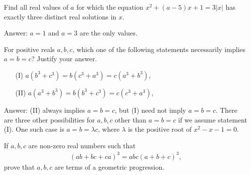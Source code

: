 \begin{tcolorbox}
\begin{question}
Find all real values of $a$ for which the equation $x^2+(a-5)x+1=3|x|$ has exactly three distinct real solutions in $x$.
\end{question}
\end{tcolorbox}


\begin{solution}[name=Solution by CRMO 2003]
Answer: $a=1$ and $a=3$ are the only values.
\end{solution}


\begin{tcolorbox}
\begin{question}
For positive reals $a,b,c$, which one of the following statements necessarily implies $a=b=c$? Justify your answer.
\begin{itemize}
    \item[(I)] $a(b^3+c^3)=b(c^3+a^3)=c(a^3+b^3)$,
    \item[(II)] $a(a^3+b^3)=b(b^3+c^3)=c(c^3+a^3)$,
\end{itemize}
\end{question}
\end{tcolorbox}


\begin{solution}[name=Solution by INMO 2016]
Answer: (II) always implies $a=b=c$, but (I) need not imply $a=b=c$. There are three other possibilities for $a,b,c$ other than $a=b=c$ if we assume statement (I). One such case is $a=b=\lambda c$, where $\lambda$ is the positive root of $x^2-x-1=0$.
\end{solution}



\begin{tcolorbox}
\begin{question}
If $a,b,c$ are non-zero real numbers such that
\begin{align*}
    (ab+bc+ca)^3 = abc(a+b+c)^3,
\end{align*}
prove that $a,b,c$ are terms of a geometric progression.
\end{question}
\end{tcolorbox}





